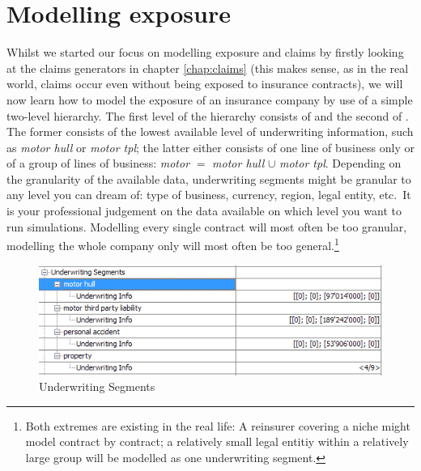 \chapter{Modelling exposure}
\label{chap:exposure}

Whilst we started our focus on modelling exposure and claims by firstly looking at the claims generators in chapter \ref{chap:claims} (this makes sense, as in the real world, claims occur even without being exposed to insurance contracts), we will now learn how to model the exposure of an insurance company by use of a simple two-level hierarchy. The first level of the hierarchy consists of  and the second of . The former consists of the lowest available level of underwriting information, such as \textit{motor hull} or \textit{motor tpl}; the latter either consists of one line of business only or of a group of lines of business: \textit{motor} $=$ \textit{motor hull} $\cup$ \textit{motor tpl}. Depending on the granularity of the available data, underwriting segments might be granular to any level you can dream of: type of business, currency, region, legal entity, etc.~It is your professional judgement on the data available on which level you want to run simulations. Modelling every single contract will most often be too granular, modelling the whole company only will most often be too general.\footnote{Both extremes are existing in the real life: A reinsurer covering a niche might model contract by contract; a relatively small legal entitiy within a relatively large group will be modelled as one underwriting segment.}

\begin{figure}[htb]
	\centering
		\includegraphics[scale=0.6]{images/UnderwritingSegments.png}
	\caption{Underwriting Segments}
	\label{fig:UnderwritingSegments}
\end{figure}

